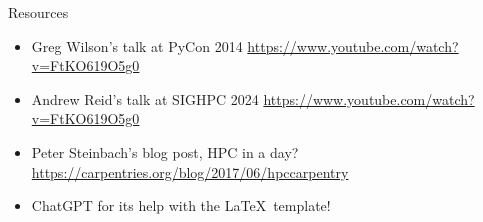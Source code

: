 \begin{frame}{Resources}
	\begin{itemize}
		\item Greg Wilson's talk at PyCon 2014 \url{https://www.youtube.com/watch?v=FtKO619O5g0}
		\item Andrew Reid's talk at SIGHPC 2024 \url{https://www.youtube.com/watch?v=FtKO619O5g0}
		\item Peter Steinbach's blog post, HPC in a day? \url{https://carpentries.org/blog/2017/06/hpccarpentry}
		\item ChatGPT for its help with the \LaTeX \ template!
	\end{itemize}
\end{frame}